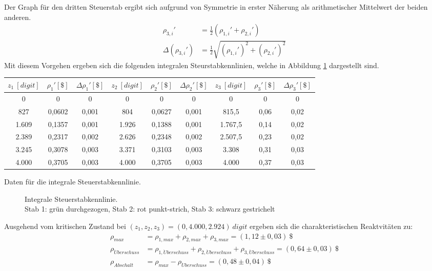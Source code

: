 		Der Graph für den dritten Steuerstab ergibt sich aufgrund von Symmetrie in erster Näherung als arithmetischer Mittelwert der beiden anderen.
				\begin{align}
					\rho_{3,i}\prime &= \frac{1}{2}(\rho_{1,i}\prime +  \rho_{2,i}\prime)\\
					\Delta(\rho_{3,i}\prime) &= \frac{1}{2}\sqrt{(\rho_{1,i}\prime)^2 +  (\rho_{2,i}\prime)^2}
				\end{align}
		Mit diesem Vorgehen ergeben sich die folgenden integralen Steurstabkennlinien, welche in Abbildung \ref{exp:intSSKL} dargestellt sind.
		\begin{center}
			\begin{tabular}{c|c|c|c|c|c|c|c|c} \label{exp:dataIntSSKL}
		    	$z_1\ [\unit{digit}]$	&	$ \rho_1\prime [\unit{\$}]$	&	$ \Delta\rho_1\prime [\unit{\$}]$	&	
		    	$z_2\ [\unit{digit}]$	&	$ \rho_2\prime [\unit{\$}]$	&	$ \Delta \rho_2\prime [\unit{\$}]$	&
		    	$z_3\ [\unit{digit}]$	&	$ \rho_3\prime [\unit{\$}]$	&	$ \Delta \rho_3\prime [\unit{\$}]$\\
		    	\hline
		    	0		&	0		&	0		&	0		&	0		&	0		&	0		&	0		&	0\\
		    	827		&	0,0602	&	0,001	&	804		&	0,0627	&	0,001	&	815,5	&	0,06	&	0,02\\
		    	1.609	&	0,1357	&	0,001	&	1.926	&	0,1388	&	0,001	&	1.767,5	&	0,14	&	0,02\\
		    	2.389	&	0,2317	&	0,002	&	2.626	&	0,2348	&	0,002	&	2.507,5	&	0,23	&	0,02\\
		    	3.245	&	0,3078	&	0,003	&	3.371	&	0,3103	&	0,003	&	3.308	&	0,31	&	0,03\\
		    	4.000	&	0,3705	&	0,003	&	4.000	&	0,3705	&	0,003	&	4.000	&	0,37	&	0,03	
		 	\end{tabular}\caption{Daten für die integrale Steuerstabkennlinie.}	
		\end{center}	
		
		\begin{figure}[hp]
								\centering
								\captionsetup{justification=centering}
								\scalebox{0.6}{
									
								}
								\caption{Integrale Steuerstabkennlinie. \\
								Stab 1: grün durchgezogen, Stab 2: rot punkt-strich, Stab 3: schwarz gestrichelt}
								\label{exp:intSSKL}
		\end{figure}
		Ausgehend vom kritischen Zustand bei $(z_1,z_2,z_3) = (0, 4.000, 2.924)\ \unit{digit}$ ergeben sich die charakteristischen Reaktvitäten zu:
		\begin{align*}
			\rho_{max} &= \rho_{1,max} + \rho_{2,max} + \rho_{3,max} = (1,12 \pm 0,03)\ \unit{\$}\\
			\rho_{\ddot{U}berschuss} &= \rho_{1,\ddot{U}berschuss} + \rho_{2,\ddot{U}berschuss} + \rho_{3,\ddot{U}berschuss}  = (0,64 \pm 0,03)\ \unit{\$}\\
			\rho_{Abschalt} &= \rho_{max} - \rho_{\ddot{U}berschuss} = (0,48 \pm 0,04)\ \unit{\$}
		\end{align*}
		
